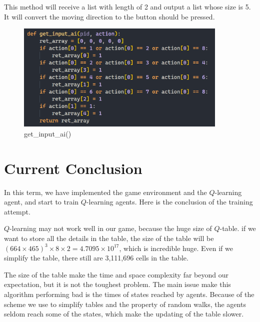 \documentclass[14pt]{extarticle}
\begin{document}
\begin{description}
    This method will receive a list with length of 2 and output a list whose size is 5. It will convert the moving direction to the button should be pressed.
    \begin{figure}[H]
		\begin{center}
			\includegraphics[width=0.9\textwidth]{actuator.png}
			\caption{get\_input\_ai()}
		\end{center}
	\end{figure}    
\end{description}	

\section{Current Conclusion}

In this term, we have implemented the game environment and the $Q$-learning agent, and start to train $Q$-learning agents. Here is the conclusion of the training attempt.

$Q$-learning may not work well in our game, because the huge size of $Q$-table. if we want to store all the details in the table, the size of the table will be $ (664 \times 465)^3 \times 8 \times 2 = 4.7095\times 10^{17} $, which is incredible huge. Even if we simplify the table, there still are 3,111,696 cells in the table. 

The size of the table make the time and space complexity far beyond our expectation, but it is not the toughest problem. The main issue make this algorithm performing bad is the times of states reached by agents. Because of the scheme we use to simplify tables and the property of random walks, the agents seldom reach some of the states, which make the updating of the table slower. 
\end{document}
